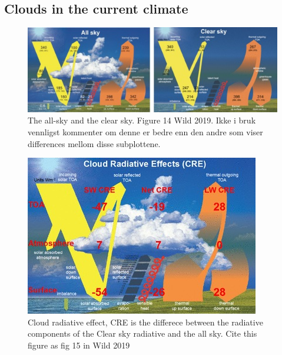 \\ \\ 
\subsection{Clouds in the current climate}
\begin{figure}
    \centering
    \includegraphics[scale = 7]{both_wild2019.jpg}
    \caption{The all-sky and the clear sky. Figure 14 Wild 2019. Ikke i bruk vennligst kommenter om denne er bedre enn den andre som viser differences mellom disse subplottene.}
    \label{fig:both_wild}
\end{figure}

\begin{figure}
    \centering
    \includegraphics[scale = 7]{CRE_wild2019.jpg}
    \caption{Cloud radiative effect, CRE is the differece between the radiative components of the Clear sky radiative and the all sky. Cite this figure as fig 15 in Wild 2019}
    \label{fig:cre}
\end{figure}

